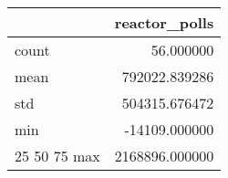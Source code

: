 \begin{tabular}{lr}
\toprule
 & reactor\_polls \\
\midrule
count & 56.000000 \\
mean & 792022.839286 \\
std & 504315.676472 \\
min & -14109.000000 \\
25%
50%
75%
max & 2168896.000000 \\
\bottomrule
\end{tabular}

